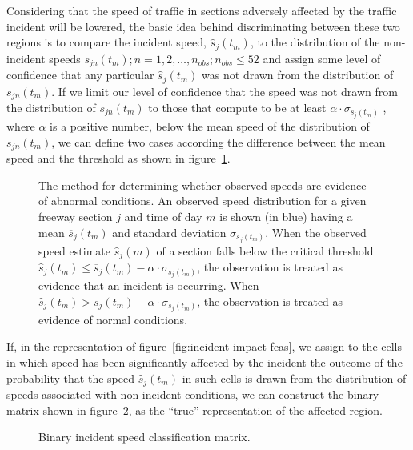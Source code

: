\documentclass[12pt]{report}
\newcommand{\inputTikZ}[1]{%
    \begin{singlespace}
    \end{singlespace}
  }
\newcommand{\inputTikZ}[1]{%
    \begin{singlespace}
    \beginpgfgraphicnamed{#1-external}%
    \endpgfgraphicnamed%
    \end{singlespace}
  }
\newcounter{time}
\newcounter{space}
\begin{document}
Considering that the speed of traffic in sections adversely affected
by the traffic incident will be lowered, the basic idea behind
discriminating between these two regions is to compare the incident
speed, $\hat{s}_j(t_m)$, to the distribution of the non-incident
speeds $s_{jn}(t_m); n = 1,2,\ldots{},n_{obs}; n_{obs}\le 52$ and
assign some level of confidence that any particular $\hat{s}_j(t_m)$
was not drawn from the distribution of $s_{jn}(t_m)$. If we limit our
level of confidence that the speed was not drawn from the distribution
of $s_{jn}(t_m)$ to those that compute to be at least
$\alpha\cdot\sigma_{s_j(t_m)}$ , where $\alpha$ is a positive number,
below the mean speed of the distribution of $s_{jn}(t_m)$, we can
define two cases according the difference between the mean speed and
the threshold as shown in figure~\ref{fig:incident-speed-case}.
\begin{figure}[t]
  \begin{center}
    \inputTikZ{figs/incident-speed-classification}
    \caption[The method for determining whether observed speeds are
    evidence of abnormal conditions.]{The method for determining whether
      observed speeds are evidence of abnormal conditions.  An observed
      speed distribution for a given freeway section $j$ and time of day
      $m$ is shown (in blue) having a mean $\overline{s}_j(t_m)$ and
      standard deviation $\sigma_{s_j(t_m)}$.  When the observed speed
      estimate $\hat{s}_j(m)$ of a section falls below the critical
      threshold $\hat{s}_j(t_m) \le \overline{s}_j(t_m) -
      \alpha\cdot\sigma_{s_j(t_m)}$, the observation is treated as
      evidence that an incident is occurring.  When $\hat{s}_j(t_m) >
      \overline{s}_j(t_m) - \alpha\cdot\sigma_{s_j(t_m)}$, the
      observation is treated as evidence of normal conditions.}
    \label{fig:incident-speed-case}
  \end{center}
\end{figure}
If, in the representation of figure~\ref{fig:incident-impact-feas}, we
assign to the cells in which speed has been significantly affected by
the incident the outcome of the probability that the speed
$\hat{s}_j(t_m)$ in such cells is drawn from the distribution of speeds
associated with non-incident conditions, we can construct the binary
matrix shown in figure~\ref{fig:incident-speed-classification-binary},
as the ``true'' representation of the affected region.
\begin{figure}[t]
  \begin{center}
    \inputTikZ{figs/time-space-incident-schematic-binary}
    \caption[Binary incident speed classification matrix]{Binary incident speed classification matrix.}
    \label{fig:incident-speed-classification-binary}
  \end{center}
\end{figure}
\end{document}
